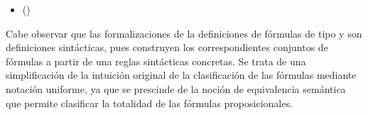 \begin{isabellebody}
\begin{isamarkuptext}
  \begin{itemize}
    \item[]  
      \hfill ()
  \end{itemize}

  Cabe observar que las formalizaciones de la definiciones de fórmulas de tipo \isa{{\isasymalpha}} y \isa{{\isasymbeta}} son 
  definiciones sintácticas, pues construyen los correspondientes conjuntos de fórmulas a partir de 
  una reglas sintácticas concretas. Se trata de una simplificación de la intuición original de la 
  clasificación de las fórmulas mediante notación uniforme, ya que se prescinde de la noción de 
  equivalencia semántica que permite clasificar la totalidad de las fórmulas proposicionales. 


\end{isamarkuptext}
\end{isabellebody}
